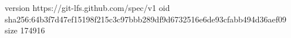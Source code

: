 version https://git-lfs.github.com/spec/v1
oid sha256:64b3f7d47ef15198f215c3c97bbb289df9d6732516e6de93cfabb494d36aef09
size 174916
